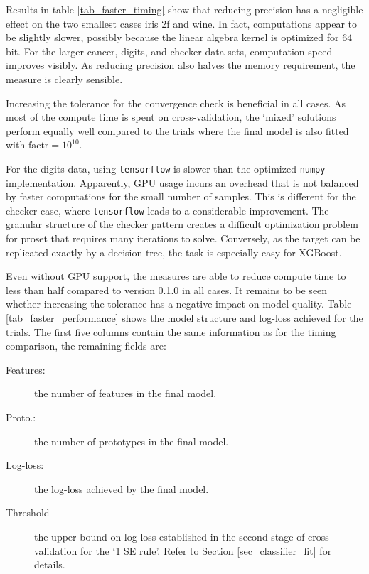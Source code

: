 %
Results in table \ref{tab_faster_timing} show that reducing precision has a negligible effect on the two smallest cases iris 2f and wine.
In fact, computations appear to be slightly slower, possibly because the linear algebra kernel is optimized for 64 bit.
For the larger cancer, digits, and checker data sets, computation speed improves visibly.
As reducing precision also halves the memory requirement, the measure is clearly sensible.\par
%
Increasing the tolerance for the convergence check is beneficial in all cases.
As most of the compute time is spent on cross-validation, the `mixed' solutions perform equally well compared to the trials where the final model is also fitted with $\text{factr}=10^{10}$.\par
%
For the digits data, using \texttt{tensorflow} is slower than the optimized \texttt{numpy} implementation.
Apparently, GPU usage incurs an overhead that is not balanced by faster computations for the small number of samples.
This is different for the checker case, where \texttt{tensorflow} leads to a considerable improvement.
The granular structure of the checker pattern creates a difficult optimization problem for proset that requires many iterations to solve.
Conversely, as the target can be replicated exactly by a decision tree, the task is especially easy for XGBoost.\par
%
Even without GPU support, the measures are able to reduce compute time to less than half compared to version 0.1.0 in all cases.
It remains to be seen whether increasing the tolerance has a negative impact on model quality.
Table \ref{tab_faster_performance} shows the model structure and log-loss achieved for the trials.
The first five columns contain the same information as for the timing comparison, the remaining fields are:
%
\begin{description}
\item[Features:] the number of features in the final model.
%
\item[Proto.:] the number of prototypes in the final model.
%
\item[Log-loss:] the log-loss achieved by the final model.
%
\item[Threshold] the upper bound on log-loss established in the second stage of cross-validation for the `1 SE rule'.
Refer to Section \ref{sec_classifier_fit} for details.
\end{description}
%
